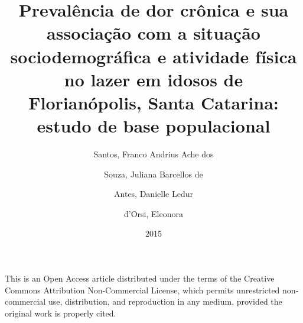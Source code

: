 \documentclass{article}
\title{Prevalência de dor crônica e sua associação com a situação
sociodemográfica e atividade física no lazer em idosos de Florianópolis, Santa
Catarina: estudo de base populacional\titlegroup{}}
\author[{I}]{Santos, Franco Andrius Ache dos}
\author[{I}]{Souza, Juliana Barcellos de}
\author[{I}]{Antes, Danielle Ledur}
\author[{I}]{d'Orsi, Eleonora}
\affil[i]{Universidade Federal de Santa Catarina}
\date{ 2015}
\begin{document}
\newcommand{\lingua}{Português}
\maketitle
\tableofcontents

This is an Open Access article distributed under the terms of the Creative
Commons Attribution Non-Commercial License, which permits unrestricted
non-commercial use, distribution, and reproduction in any medium, provided the
original work is properly cited.
\begingroup
\renewcommand{\section}[1]{\subsection*{#1}}
\end{document}
